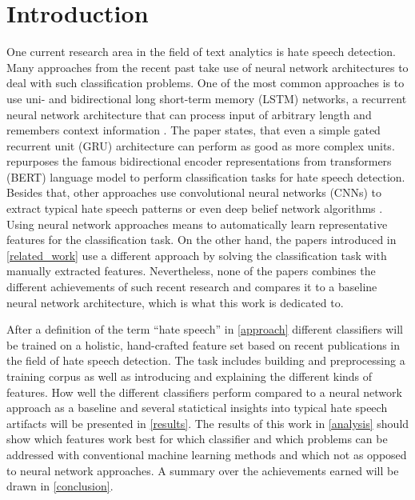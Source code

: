 \section{Introduction}

One current research area in the field of text analytics is hate speech detection. Many approaches from the recent past take use of neural network architectures to deal with such classification problems. One of the most common approaches is to use uni- and bidirectional long short-term memory (LSTM) networks, a recurrent neural network architecture that can process input of arbitrary length and remembers context information \cite{Dorris2020, Syam2019, Saksesi2018}. The paper \cite{Founta2019} states, that even a simple gated recurrent unit (GRU) architecture can perform as good as more complex units. \cite{Saleh2020} repurposes the famous bidirectional encoder representations from transformers (BERT) language model to perform classification tasks for hate speech detection. Besides that, other approaches use convolutional neural networks (CNNs) to extract typical hate speech patterns \cite{Badjatiya2017, Roy2020, Kapil2020} or even deep belief network algorithms \cite{Muhammad2020}. Using neural network approaches means to automatically learn representative features for the classification task. On the other hand, the papers introduced in \autoref{related_work} use a different approach by solving the classification task with manually extracted features. Nevertheless, none of the papers combines the different achievements of such recent research and compares it to a baseline neural network architecture, which is what this work is dedicated to.

After a definition of the term \enquote{hate speech} in \autoref{approach} different classifiers will be trained on a holistic, hand-crafted feature set based on recent publications in the field of hate speech detection. The task includes building and preprocessing a training corpus as well as introducing and explaining the different kinds of features. How well the different classifiers perform compared to a neural network approach as a baseline and several statictical insights into typical hate speech artifacts will be presented in \autoref{results}. The results of this work in \autoref{analysis} should show which features work best for which classifier and which problems can be addressed with conventional machine learning methods and which not as opposed to neural network approaches. A summary over the achievements earned will be drawn in \autoref{conclusion}.